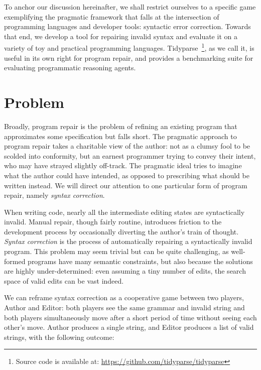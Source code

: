 \documentclass[sigplan,screen]{acmart}
\begin{document}
To anchor our discussion hereinafter, we shall restrict ourselves to a specific game exemplifying the pragmatic framework that falls at the intersection of programming languages and developer tools: syntactic error correction. Towards that end, we develop a tool for repairing invalid syntax and evaluate it on a variety of toy and practical programming languages. Tidyparse~\footnote{Source code is available at: \url{https://github.com/tidyparse/tidyparse}}, as we call it, is useful in its own right for program repair, and provides a benchmarking suite for evaluating programmatic reasoning agents.

\section{Problem}


Broadly, program repair is the problem of refining an existing program that approximates some specification but falls short. The pragmatic approach to program repair takes a charitable view of the author: not as a clumsy fool to be scolded into conformity, but an earnest programmer trying to convey their intent, who may have strayed slightly off-track. The pragmatic ideal tries to imagine what the author could have intended, as opposed to prescribing what should be written instead. We will direct our attention to one particular form of program repair, namely \emph{syntax correction}.

When writing code, nearly all the intermediate editing states are syntactically invalid. Manual repair, though fairly routine, introduces friction to the development process by occasionally diverting the author's train of thought. \textit{Syntax correction} is the process of automatically repairing a syntactically invalid program. This problem may seem trivial but can be quite challenging, as well-formed programs have many semantic constraints, but also because the solutions are highly under-determined: even assuming a tiny number of edits, the search space of valid edits can be vast indeed.

We can reframe syntax correction as a cooperative game between two players, Author and Editor: both players see the same grammar and invalid string and both players simultaneously move after a short period of time without seeing each other's move. Author produces a single string, and Editor produces a list of valid strings, with the following outcome:
\end{document}
